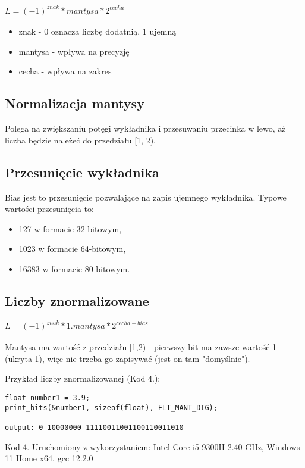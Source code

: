 \documentclass{article}
\begin{document}
\centerline{\(L = \mathrm{(-1)}_{}^{znak}*mantysa*\mathrm{2}_{}^{cecha}\)}
\bigbreak
\begin{itemize}
\item znak - 0 oznacza liczbę dodatnią, 1 ujemną
\item mantysa - wpływa na precyzję
\item cecha - wpływa na zakres
\end{itemize}

\subsection{Normalizacja mantysy}

Polega na zwiększaniu potęgi wykładnika i przesuwaniu przecinka w lewo, aż liczba będzie należeć do przedziału [1, 2).

\subsection{Przesunięcie wykładnika}

Bias jest to przesunięcie pozwalające na zapis ujemnego wykładnika. Typowe wartości przesunięcia to:

\begin{itemize}
\item 127 w formacie 32-bitowym,
\item 1023 w formacie 64-bitowym,
\item 16383 w formacie 80-bitowym.
\end{itemize}

\subsection{Liczby znormalizowane}


\centerline{\(L = \mathrm{(-1)}_{}^{znak}*1.mantysa*\mathrm{2}_{}^{cecha - bias}\)}
\bigbreak
Mantysa ma wartość z przedziału [1,2) - pierwszy bit ma zawsze wartość 1 (ukryta 1), więc nie trzeba go zapisywać (jest on tam "domyślnie"). 

\bigbreak
\noindent
Przykład liczby znormalizowanej (Kod 4.):

\begin{verbatim}
float number1 = 3.9;
print_bits(&number1, sizeof(float), FLT_MANT_DIG);

output: 0 10000000 11110011001100110011010
\end{verbatim}
\centerline{Kod 4. Uruchomiony z wykorzystaniem: Intel Core i5-9300H 2.40 GHz, Windows 11 Home x64, gcc 12.2.0}
\end{document}
